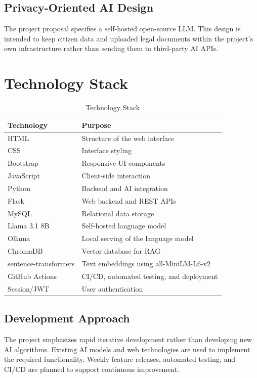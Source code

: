 \documentclass[12pt,a4paper]{report}
\begin{document}
\section{Privacy-Oriented AI Design}

The project proposal specifies a self-hosted open-source LLM. This design is intended to keep citizen data and uploaded legal documents within the project's own infrastructure rather than sending them to third-party AI APIs.

\chapter{Technology Stack}

\begin{table}[H]
\centering
\caption{Technology Stack}
\begin{tabular}{p{4cm}p{8.5cm}}
\toprule
\textbf{Technology} & \textbf{Purpose} \\
\midrule
HTML & Structure of the web interface \\
CSS & Interface styling \\
Bootstrap & Responsive UI components \\
JavaScript & Client-side interaction \\
Python & Backend and AI integration \\
Flask & Web backend and REST APIs \\
MySQL & Relational data storage \\
Llama 3.1 8B & Self-hosted language model \\
Ollama & Local serving of the language model \\
ChromaDB & Vector database for RAG \\
sentence-transformers & Text embeddings using all-MiniLM-L6-v2 \\
GitHub Actions & CI/CD, automated testing, and deployment \\
Session/JWT & User authentication \\
\bottomrule
\end{tabular}
\end{table}

\section{Development Approach}

The project emphasizes rapid iterative development rather than developing new AI algorithms. Existing AI models and web technologies are used to implement the required functionality. Weekly feature releases, automated testing, and CI/CD are planned to support continuous improvement.
\end{document}
